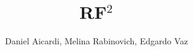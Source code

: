 
\title{RF$^{2}$}

\author{Daniel Aicardi, Melina Rabinovich, Edgardo Vaz}



\degree{}


\maketitle










